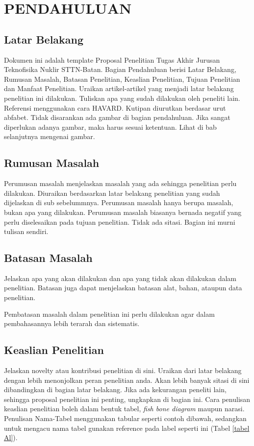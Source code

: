 \chapter{\uppercase{Pendahuluan}}\label{pendahuluan}
\doublespacing
\section{Latar Belakang}
Dokumen ini adalah template Proposal Penelitian Tugas Akhir Jurusan Teknofisika Nuklir STTN-Batan. Bagian Pendahuluan berisi Latar Belakang, Rumusan Masalah, Batasan Penelitian, Keaslian Penelitian, Tujuan Penelitian dan Manfaat Penelitian. Uraikan artikel-artikel yang menjadi latar belakang penelitian ini dilakukan. Tuliskan apa yang sudah dilakukan oleh peneliti lain. Referensi menggunakan cara HAVARD. Kutipan diurutkan berdasar urut abfabet.  Tidak disarankan ada gambar di bagian pendahuluan. Jika sangat diperlukan adanya gambar, maka harus sesuai ketentuan. Lihat di bab selanjutnya mengenai gambar.

\section{Rumusan Masalah}
Perumusan masalah menjelaskan masalah yang ada sehingga penelitian perlu dilakukan. Diuraikan berdasarkan latar belakang penelitian yang sudah dijelaskan di sub sebelummnya. Perumusan masalah hanya berupa masalah, bukan apa yang dilakukan. Perumusan masalah biasanya bernada negatif yang perlu diselesaikan pada tujuan penelitian. Tidak ada sitasi. Bagian ini murni tulisan sendiri.

\section{Batasan Masalah}
Jelaskan apa yang akan dilakukan dan apa yang tidak akan dilakukan dalam penelitian. Batasan juga dapat menjelaskan batasan alat, bahan, ataupun data penelitian.

Pembatasan masalah dalam penelitian ini perlu dilakukan agar dalam pembahasannya lebih terarah dan sistematis.

\section{Keaslian Penelitian}
Jelaskan novelty atau kontribusi penelitian di sini. Uraikan dari latar belakang dengan lebih menonjolkan peran penelitian anda. Akan lebih banyak sitasi di sini dibandingkan di bagian latar belakang. Jika ada kekurangan peneliti lain, sehingga proposal penelitian ini penting, ungkapkan di bagian ini. Cara penulisan keaslian penelitian boleh dalam bentuk tabel, \textit{fish bone diagram} maupun narasi. Penulisan Nama-Tabel menggunakan tabular seperti contoh dibawah, sedangkan untuk mengacu nama tabel gunakan reference pada label seperti ini (Tabel \ref{tabel Al}). %

